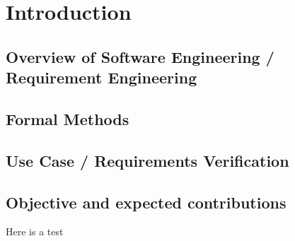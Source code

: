 \chapter{Introduction}

\section{Overview of Software Engineering / Requirement Engineering}

\section{Formal Methods}

\section{Use Case / Requirements Verification}

\section{Objective and expected contributions}
Here is a test \cite{Lambers2010} \cite{Berthold2002}
